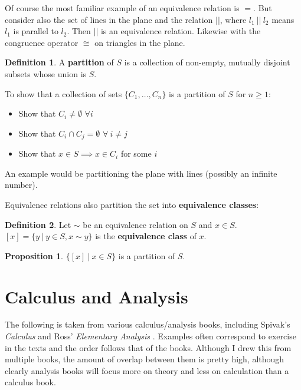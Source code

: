 \documentclass{article}
\theoremstyle{definition}
\newtheorem{definition}{Definition}[section]
\newtheorem{proposition}{Proposition}[section]
\begin{document}
Of course the most familiar example of an equivalence relation is $=$. But consider also the set of lines in the plane and the relation $||$, where $l_1 \ || \ l_2$ means $l_1$ is parallel to $l_2$. Then $||$ is an equivalence relation. Likewise with the congruence operator $\cong$ on triangles in the plane.

\begin{definition}
A \textbf{partition} of $S$ is a collection of non-empty, mutually disjoint subsets whose union is $S$.
\end{definition}

To show that a collection of sets $\{ C_1, \ldots, C_n \}$ is a partition of $S$ for $n \ge 1$:

\begin{itemize}
\item Show that $C_i \neq \emptyset$ $\forall i$
\item Show that $C_i \cap C_j = \emptyset$ $\forall \ i \neq j$
\item Show that $x \in S \implies x \in C_i$ for some $i$
\end{itemize}

An example would be partitioning the plane with lines (possibly an infinite number).

Equivalence relations also partition the set into \textbf{equivalence classes}:

\begin{definition}
Let $\sim$ be an equivalence relation on $S$ and $x \in S$. \\
$[x] = \{ y \ | \ y \in S, x \sim y\}$ is the \textbf{equivalence class} of $x$.
\end{definition}

\begin{proposition}
$\{[x] \ | \ x \in S \}$ is a partition of $S$.
\end{proposition}

\section{Calculus and Analysis}

The following is taken from various calculus/analysis books, including Spivak's {\it Calculus} \cite{spivak} and Ross' {\it Elementary Analysis} \cite{ross}. Examples often correspond to exercise in the texts and the order follows that of the books. Although I drew this from multiple books, the amount of overlap between them is pretty high, although clearly analysis books will focus more on theory and less on calculation than a calculus book.
\end{document}

